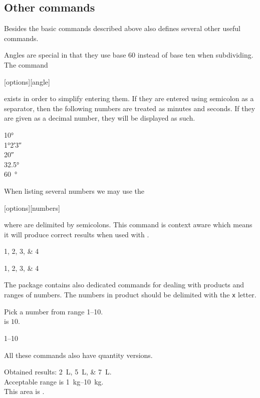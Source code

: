 \subsection{Other  commands}

Besides the basic commands described above  also defines several
other useful commands.

Angles are special in that they use base $60$ instead of base ten when
subdividing. The command
\begin{lscommand}
  [options][angle]
\end{lscommand}
exists in order to simplify entering them. If they are entered using semicolon
as a separator, then the following numbers are treated as minutes and seconds.
If they are given as a decimal number, they will be displayed as such.
\begin{example}
\ang{10} \\
\ang{1;2;3} \\
\ang{;;20} \\
\ang{32.5} \\
\qty{60}{\degree}
\end{example}

When listing several numbers we may use the
\begin{lscommand}
  [options][numbers]
\end{lscommand}
where  are delimited by semicolons. This command is context aware
which means it will produce correct results when used with .
\begin{example}
\numlist{1;2;3;4}

\begin{german}
  \numlist{1;2;3;4}
\end{german}
\end{example}

The package contains also dedicated commands for dealing with products and
ranges of numbers. The numbers in product should be delimited with the \verb|x|
letter.
\begin{example}
Pick a number from
range \numrange{1}{10}. \\
 is $10$. \\
\begin{german}
  \numrange{1}{10}
\end{german}
\end{example}

All these commands also have quantity versions.
\begin{example}
Obtained results:
\qtylist{2;5;7}{\L}.\\
Acceptable range is
\qtyrange{1}{10}{\kg}. \\
This area is
.
\end{example}


